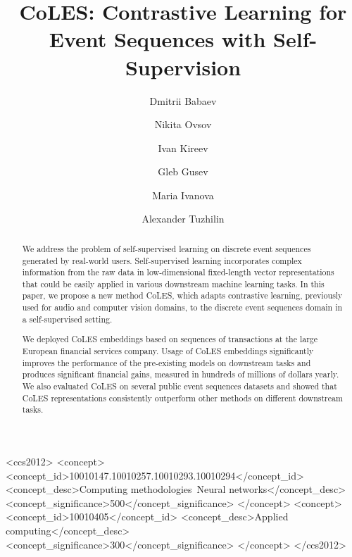 \documentclass[sigconf]{acmart}
\begin{document}
\title{CoLES: Contrastive Learning for Event Sequences with Self-Supervision}

\author{Dmitrii Babaev}

\author{Nikita Ovsov}

\author{Ivan Kireev}

\author{Gleb Gusev}

\author{Maria Ivanova}

\author{Alexander Tuzhilin}

\begin{abstract}
We address the problem of self-supervised learning on discrete event sequences generated by real-world users. Self-supervised learning incorporates complex information from the raw data in low-dimensional fixed-length vector representations that could be easily applied in various downstream machine learning tasks. In this paper, we propose a new method CoLES, which adapts contrastive learning, previously used for audio and computer vision domains, to the discrete event sequences domain in a self-supervised setting.

We deployed CoLES embeddings based on sequences of transactions at the large European financial services company. Usage of CoLES embeddings significantly improves the performance of the pre-existing models on downstream tasks and produces significant financial gains, measured in hundreds of millions of dollars yearly.
We also evaluated CoLES on several public event sequences datasets and showed that CoLES representations consistently outperform other methods on different downstream tasks.
\end{abstract}

\begin{CCSXML}
<ccs2012>
<concept>
<concept_id>10010147.10010257.10010293.10010294</concept_id>
<concept_desc>Computing methodologies~Neural networks</concept_desc>
<concept_significance>500</concept_significance>
</concept>
<concept>
<concept_id>10010405</concept_id>
<concept_desc>Applied computing</concept_desc>
<concept_significance>300</concept_significance>
</concept>
</ccs2012>
\end{CCSXML}
\end{document}
